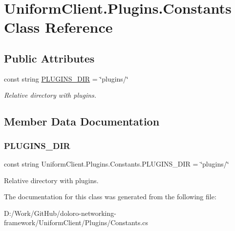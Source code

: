 \hypertarget{class_uniform_client_1_1_plugins_1_1_constants}{}\section{Uniform\+Client.\+Plugins.\+Constants Class Reference}
\label{class_uniform_client_1_1_plugins_1_1_constants}
\subsection*{Public Attributes}
\begin{DoxyCompactItemize}
\item 
const string \mbox{\hyperlink{class_uniform_client_1_1_plugins_1_1_constants_a7005abdb0c3ee5ba9e841769a7ecd575}{P\+L\+U\+G\+I\+N\+S\+\_\+\+D\+IR}} = \char`\"{}plugins/\char`\"{}
\begin{DoxyCompactList}\small\item\em Relative directory with plugins. \end{DoxyCompactList}\end{DoxyCompactItemize}


\subsection{Member Data Documentation}
\mbox{\label{class_uniform_client_1_1_plugins_1_1_constants_a7005abdb0c3ee5ba9e841769a7ecd575}} 
\subsubsection{\texorpdfstring{P\+L\+U\+G\+I\+N\+S\+\_\+\+D\+IR}{PLUGINS\_DIR}}
{\footnotesize\ttfamily const string Uniform\+Client.\+Plugins.\+Constants.\+P\+L\+U\+G\+I\+N\+S\+\_\+\+D\+IR = \char`\"{}plugins/\char`\"{}}



Relative directory with plugins. 



The documentation for this class was generated from the following file\+:\begin{DoxyCompactItemize}
\item 
D\+:/\+Work/\+Git\+Hub/doloro-\/networking-\/framework/\+Uniform\+Client/\+Plugins/Constants.\+cs\end{DoxyCompactItemize}
